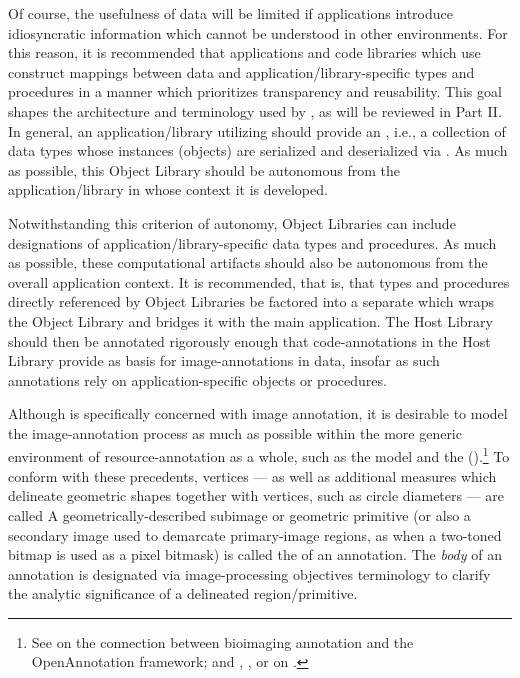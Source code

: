 {\begin{description}
Of course, the usefulness of \AXFI{} data will 
be limited if applications introduce idiosyncratic 
information which cannot be understood in other 
\AXFI{} environments.  For this reason, it is 
recommended that applications and code libraries 
which use \AXFI{} construct mappings between 
\AXFI{} data and application/library-specific 
types and procedures in a manner which prioritizes 
transparency and reusability.  This goal shapes 
the architecture and terminology used by 
\AXFI{}, as will be reviewed in Part II.  
In general, an application/library utilizing 
\AXFI{} should provide an , 
i.e., a collection of data types whose instances 
(objects) are serialized and deserialized via 
\AXFI{}.  As much as possible, this Object Library 
should be autonomous from the application/library 
in whose context it is developed.

Notwithstanding this criterion of autonomy, 
\AXFI{} Object Libraries can include designations 
of application/library-specific data types 
and procedures.  As much as possible, these 
computational artifacts should also be 
autonomous from the overall application context.  
It is recommended, that is, that types and 
procedures directly referenced by \AXFI{} Object 
Libraries be factored into a separate 
 which wraps 
the Object Library and bridges it with the 
main application.  The Host Library should 
then be annotated rigorously enough that 
code-annotations in the Host Library 
provide as basis for image-annotations 
in \AXFI{} data, insofar as such annotations 
rely on application-specific objects or procedures. 

\item[Annotation Body and Targets]  Although 
\AXFI{} is specifically concerned with 
image annotation, it is desirable to model 
the image-annotation process as much as possible 
within the more generic environment of 
resource-annotation as a whole, such 
as the  model and the 
(\LAF{}).\footnote{See  on the connection between bioimaging 
annotation and the OpenAnnotation framework; 
and , , or  on \sLAF{}.}  To conform with 
these precedents, \AXFI{} vertices --- as well 
as additional measures which delineate geometric 
shapes together with vertices, such as circle 
diameters --- are called   A 
geometrically-described subimage or geometric primitive 
(or also a secondary image used to demarcate 
primary-image regions, as when a two-toned bitmap 
is used as a pixel bitmask) is called 
the  of an annotation.  The \textit{body} 
of an annotation is designated via 
image-processing objectives terminology to 
clarify the analytic significance of a 
delineated region/primitive.


\end{description}}
